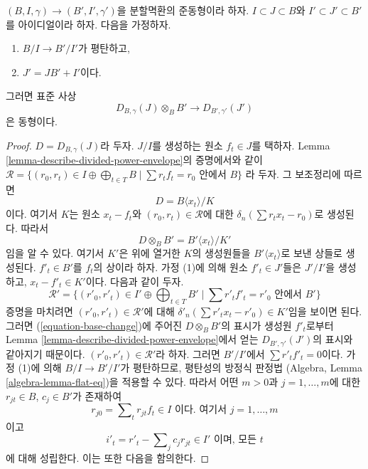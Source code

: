 \begin{lemma}
\label{lemma-flat-extension-divided-power-envelope}
$(B, I, \gamma) \to (B', I', \gamma')$을 분할멱환의 준동형이라 하자.
$I \subset J \subset B$와 $I' \subset J' \subset B'$를 아이디얼이라 하자.
다음을 가정하자.
\begin{enumerate}
\item $B/I \to B'/I'$가 평탄하고,
\item $J' = JB' + I'$이다.
\end{enumerate}
그러면 표준 사상
$$
D_{B, \gamma}(J) \otimes_B B' \longrightarrow D_{B', \gamma'}(J')
$$
은 동형이다.
\end{lemma}

\begin{proof}
$D = D_{B, \gamma}(J)$라 두자. $J/I$를 생성하는 원소 $f_t \in J$를 택하자.
Lemma \ref{lemma-describe-divided-power-envelope}의 증명에서와 같이
$
\mathcal{R} = \{(r_0, r_t) \in I \oplus \bigoplus\nolimits_{t \in T} B
\mid \sum r_t f_t = r_0 \text{ 안에서 }B\}
$
라 두자. 그 보조정리에 따르면
$$
D = B\langle x_t \rangle/ K
$$
이다. 여기서 $K$는 원소 $x_t - f_t$와
$(r_0, r_t) \in \mathcal{R}$에 대한
$\delta_n(\sum r_t x_t - r_0)$로 생성된다. 따라서
\begin{equation}
\label{equation-base-change}
D \otimes_B B' = B'\langle x_t \rangle/K'
\end{equation}
임을 알 수 있다. 여기서 $K'$은 위에 열거한 $K$의 생성원들을
$B'\langle x_t \rangle$로 보낸 상들로 생성된다.
$f'_t \in B'$를 $f_t$의 상이라 하자. 가정 (1)에 의해 원소
$f'_t \in J'$들은 $J'/I'$을 생성하고, $x_t - f'_t \in K'$이다.
다음과 같이 두자.
$$
\mathcal{R}' =
\{(r'_0, r'_t) \in I' \oplus \bigoplus\nolimits_{t \in T} B'
\mid \sum r'_t f'_t = r'_0 \text{ 안에서 }B'\}
$$
증명을 마치려면 $(r'_0, r'_t) \in \mathcal{R}'$에 대해
$\delta'_n(\sum r'_t x_t - r'_0) \in K'$임을 보이면 된다.
그러면 (\ref{equation-base-change})에 주어진 $D \otimes_B B'$의 표시가
생성원 $f'_t$로부터 Lemma \ref{lemma-describe-divided-power-envelope}에서
얻는 $D_{B', \gamma'}(J')$의 표시와 같아지기 때문이다.
$(r'_0, r'_t) \in \mathcal{R}'$라 하자. 그러면
$B'/I'$에서 $\sum r'_t f'_t = 0$이다. 가정 (1)에 의해
$B/I \to B'/I'$가 평탄하므로, 평탄성의 방정식 판정법
(Algebra, Lemma \ref{algebra-lemma-flat-eq})을 적용할 수 있다.
따라서 어떤 $m > 0$과 $j = 1, \ldots, m$에 대한
$r_{jt} \in B$, $c_j \in B'$가 존재하여
$$
r_{j0} = \sum\nolimits_t r_{jt} f_t  \in I \text{ 이다. 여기서 } j = 1, \ldots, m
$$
이고
$$
i'_t  = r'_t - \sum\nolimits_j c_j r_{jt} \in I' \text{ 이며, 모든 }t
$$
에 대해 성립한다. 이는 또한 다음을 함의한다.

\end{proof}
